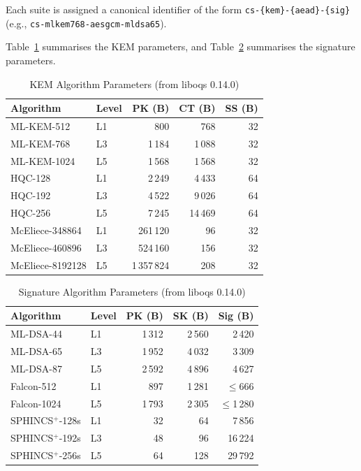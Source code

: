 \documentclass[conference]{IEEEtran}
\begin{document}
Each suite is assigned a canonical identifier of the form \texttt{cs-\{kem\}-\{aead\}-\{sig\}} (e.g., \texttt{cs-mlkem768-aesgcm-mldsa65}).

Table~\ref{tab:kem-params} summarises the KEM parameters, and Table~\ref{tab:sig-params} summarises the signature parameters.

\begin{table}[t]
\centering
\caption{KEM Algorithm Parameters (from liboqs 0.14.0)}
\label{tab:kem-params}
\small
\begin{tabular}{@{}llrrr@{}}
\toprule
\textbf{Algorithm} & \textbf{Level} & \textbf{PK (B)} & \textbf{CT (B)} & \textbf{SS (B)} \\
\midrule
ML-KEM-512 & L1 & 800 & 768 & 32 \\
ML-KEM-768 & L3 & 1\,184 & 1\,088 & 32 \\
ML-KEM-1024 & L5 & 1\,568 & 1\,568 & 32 \\
HQC-128 & L1 & 2\,249 & 4\,433 & 64 \\
HQC-192 & L3 & 4\,522 & 9\,026 & 64 \\
HQC-256 & L5 & 7\,245 & 14\,469 & 64 \\
McEliece-348864 & L1 & 261\,120 & 96 & 32 \\
McEliece-460896 & L3 & 524\,160 & 156 & 32 \\
McEliece-8192128 & L5 & 1\,357\,824 & 208 & 32 \\
\bottomrule
\end{tabular}
\end{table}

\begin{table}[t]
\centering
\caption{Signature Algorithm Parameters (from liboqs 0.14.0)}
\label{tab:sig-params}
\small
\begin{tabular}{@{}llrrr@{}}
\toprule
\textbf{Algorithm} & \textbf{Level} & \textbf{PK (B)} & \textbf{SK (B)} & \textbf{Sig (B)} \\
\midrule
ML-DSA-44 & L1 & 1\,312 & 2\,560 & 2\,420 \\
ML-DSA-65 & L3 & 1\,952 & 4\,032 & 3\,309 \\
ML-DSA-87 & L5 & 2\,592 & 4\,896 & 4\,627 \\
Falcon-512 & L1 & 897 & 1\,281 & $\leq$666 \\
Falcon-1024 & L5 & 1\,793 & 2\,305 & $\leq$1\,280 \\
SPHINCS$^+$-128s & L1 & 32 & 64 & 7\,856 \\
SPHINCS$^+$-192s & L3 & 48 & 96 & 16\,224 \\
SPHINCS$^+$-256s & L5 & 64 & 128 & 29\,792 \\
\bottomrule
\end{tabular}
\end{table}
\end{document}
